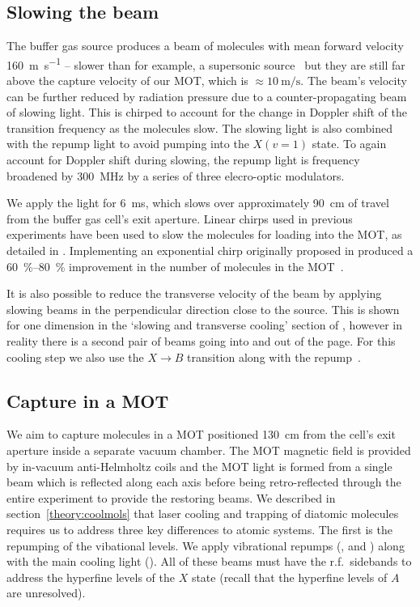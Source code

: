 \subsection{Slowing the beam}

The buffer gas source produces a beam of molecules with mean forward velocity
\SI{160}{\meter\per\second} -- slower than for example, a supersonic
source~\cite{Mathavan2016} but they are still far above the capture velocity of
our MOT, which is $\approx\SI{10}{\meter\per\second}$. The beam's velocity can be
further reduced by radiation pressure due to a counter-propagating beam of
 slowing light. This is chirped to account for the change in
Doppler shift of the transition frequency as the molecules slow. The slowing
light is also combined with the  repump light to avoid pumping
into the $X(v=1)$ state. To again account for Doppler shift during slowing, the
repump light is frequency broadened by \SI{300}{\mega\hertz} by a series of
three elecro-optic modulators.

We apply the light for \SI{6}{\milli\second}, which slows over approximately
\SI{90}{\centi\meter} of travel from the buffer gas cell's exit aperture.
Linear chirps used in previous experiments have been used to slow the molecules
for loading into the MOT, as detailed in . Implementing an
exponential chirp originally proposed in   produced a
\SIrange{60}{80}{\percent} improvement in the number of molecules in the
MOT~\cite{Jurgilas2021}.

It is also possible to reduce the transverse velocity of the beam by applying
slowing beams in the perpendicular direction close to the source. This is shown
for one dimension in the `slowing and transverse cooling' section of
, however in reality there is a second pair
of beams going into and out of the page. For this cooling step we also use the
$X\rightarrow B$ transition along with the 
repump~\cite{Jurgilas2021}.

\subsection{Capture in a MOT}
\label{overview:MOT}

We aim to capture molecules in a MOT positioned \SI{130}{\centi\meter} from the
cell's exit aperture inside a separate vacuum chamber. The MOT magnetic field
is provided by in-vacuum anti-Helmholtz coils and the MOT light is formed from
a single beam which is reflected along each axis before being retro-reflected
through the entire experiment to provide the restoring beams.
%
We described in section~\ref{theory:coolmols} that laser cooling and trapping of diatomic
molecules requires us to address three key differences to atomic systems. The
first is the repumping of the vibational levels. We apply vibrational repumps (, 
and ) along with the main cooling light ().  All of these beams must have the r.f.\ sidebands
to address the hyperfine levels of the $X$ state (recall that the hyperfine
levels of $A$ are unresolved).

